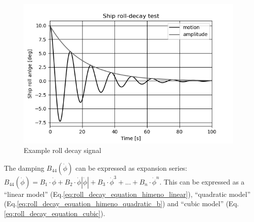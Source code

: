 \begin{figure}[H]
    \centering
    \includegraphics[width=\linewidth]{kappa/images/roll-decay.png}
    \caption{Example roll decay signal}
    \label{fig:rolldecay}
\end{figure}

\noindent The damping $B_{44}\left(\dot{\phi}\right)$ can be expressed as expansion series:  
$ B_{44}\left(\dot{\phi}\right) = B_1\cdot\dot{\phi} + B_2\cdot\dot{\phi}\left|\dot{\phi}\right| + B_3\cdot\dot{\phi}^3 + ... + B_n\cdot\dot{\phi}^n$. This can be expressed as a ``linear model'' (Eq.\ref{eq:roll_decay_equation_himeno_linear}), ``quadratic model'' (Eq.\ref{eq:roll_decay_equation_himeno_quadratic_b}) and ``cubic model'' (Eq.\ref{eq:roll_decay_equation_cubic}).





